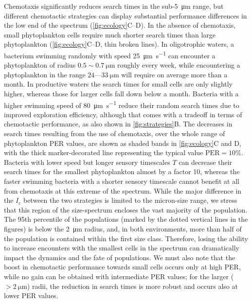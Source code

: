 \documentclass[9pt,twocolumn,twoside]{pnas-new}
\begin{document}
Chemotaxis significantly reduces search times in the sub-\SI{5}{\micro\m} range, but different chemotactic strategies can display substantial performance differences in the low end of the spectrum (\autoref{fig:ecology}C--D).
In the absence of chemotaxis, small phytoplankton cells require much shorter search times than large phytoplankton (\autoref{fig:ecology}C--D, thin broken lines).
In oligotrophic waters, a bacterium swimming randomly with speed \SI{25}{\micro\m\per\s} can encounter a phytoplankton of radius $0.5\sim\SI{0.7}{\micro\m}$ roughly every week, while encountering a phytoplankton in the range $24\text{---}\SI{33}{\micro\m}$ will require on average more than a month. 
In productive waters the search times for small cells are only slightly higher, whereas those for larger cells fall down below a month. Bacteria with a higher swimming speed of \SI{80}{\micro\m\per\s} reduce their random search times due to improved exploration efficiency, although that comes with a tradeoff in terms of chemotactic performance, as also shown in \autoref{fig:strategies}B.
The decreases in search times resulting from the use of chemotaxis, over the whole range of phytoplankton PER values, are shown as shaded bands in \autoref{fig:ecology}C and D, with the thick marker-decorated line representing the typical value $\mathrm{PER}=10\%$.
Bacteria with lower speed but longer sensory timescales $T$ can decrease their search times for the smallest phytoplankton almost by a factor 10, whereas the faster swimming bacteria with a shorter sensory timescale cannot benefit at all from chemotaxis at this extreme of the spectrum.
While the major difference in the $I_c$ between the two strategies is limited to the micron-size range, we stress that this region of the size-spectrum encloses the vast majority of the population.
The 95th percentile of the populations (marked by the dotted vertical lines in the figures) is below the \SI{2}{\micro\m} radius, and, in both environments, more than half of the population is contained within the first size class.
Therefore, losing the ability to increase encounters with the smallest cells in the spectrum can dramatically impact the dynamics and the fate of populations.
We must also note that the boost in chemotactic performance towards small cells occurs only at high PER, while no gain can be obtained with intermediate PER values; for the larger ($>\SI{2}{\micro\m}$) radii, the reduction in search times is more robust and occurs also at lower PER values.
\end{document}
